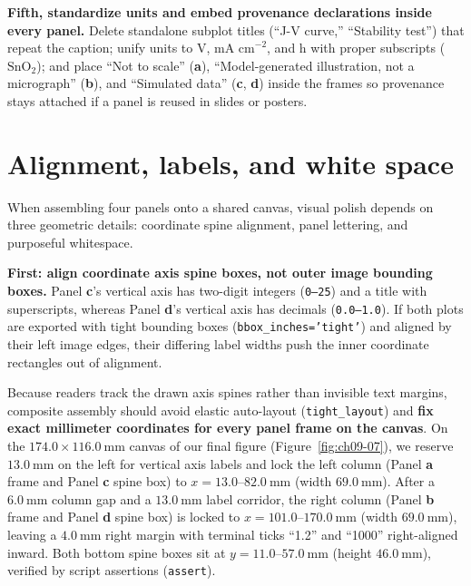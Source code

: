 \textbf{Fifth, standardize units and embed provenance declarations inside every panel.}
Delete standalone subplot titles (``J-V curve,'' ``Stability test'') that repeat the caption; unify units to $\text{V}$, $\text{mA cm}^{-2}$, and $\text{h}$ with proper subscripts ($\mathrm{SnO_2}$); and place ``Not to scale'' (\textbf{a}), ``Model-generated illustration, not a micrograph'' (\textbf{b}), and ``Simulated data'' (\textbf{c}, \textbf{d}) inside the frames so provenance stays attached if a panel is reused in slides or posters.

\section{Alignment, labels, and white space}

When assembling four panels onto a shared canvas, visual polish depends on three geometric details: coordinate spine alignment, panel lettering, and purposeful whitespace.

\textbf{First: align coordinate axis spine boxes, not outer image bounding boxes.}
Panel \textbf{c}'s vertical axis has two-digit integers (\texttt{0--25}) and a title with superscripts, whereas Panel \textbf{d}'s vertical axis has decimals (\texttt{0.0--1.0}). If both plots are exported with tight bounding boxes (\texttt{bbox\_inches='tight'}) and aligned by their left image edges, their differing label widths push the inner coordinate rectangles out of alignment.

Because readers track the drawn axis spines rather than invisible text margins, composite assembly should avoid elastic auto-layout (\texttt{tight\_layout}) and \textbf{fix exact millimeter coordinates for every panel frame on the canvas}. On the $174.0 \times 116.0\ \text{mm}$ canvas of our final figure (Figure~\ref{fig:ch09-07}), we reserve $13.0\ \text{mm}$ on the left for vertical axis labels and lock the left column (Panel \textbf{a} frame and Panel \textbf{c} spine box) to $x = 13.0\text{--}82.0\ \text{mm}$ (width $69.0\ \text{mm}$). After a $6.0\ \text{mm}$ column gap and a $13.0\ \text{mm}$ label corridor, the right column (Panel \textbf{b} frame and Panel \textbf{d} spine box) is locked to $x = 101.0\text{--}170.0\ \text{mm}$ (width $69.0\ \text{mm}$), leaving a $4.0\ \text{mm}$ right margin with terminal ticks ``1.2'' and ``1000'' right-aligned inward. Both bottom spine boxes sit at $y = 11.0\text{--}57.0\ \text{mm}$ (height $46.0\ \text{mm}$), verified by script assertions (\texttt{assert}).

